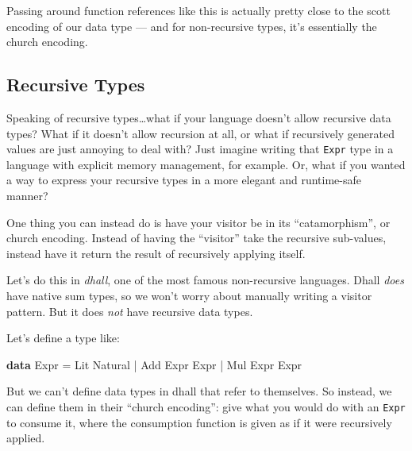 \documentclass[]{article}
\newenvironment{Shaded}{}{}
\newcommand{\DataTypeTok}[1]{\textcolor[rgb]{0.56,0.13,0.00}{#1}}
\newcommand{\KeywordTok}[1]{\textcolor[rgb]{0.00,0.44,0.13}{\textbf{#1}}}
\newcommand{\OperatorTok}[1]{\textcolor[rgb]{0.40,0.40,0.40}{#1}}
\newcommand{\OtherTok}[1]{\textcolor[rgb]{0.00,0.44,0.13}{#1}}
\begin{document}
Passing around function references like this is actually pretty close to the
scott encoding of our data type --- and for non-recursive types, it's
essentially the church encoding.

\subsection{Recursive Types}\label{recursive-types}

Speaking of recursive types\ldots what if your language doesn't allow recursive
data types? What if it doesn't allow recursion at all, or what if recursively
generated values are just annoying to deal with? Just imagine writing that
\texttt{Expr} type in a language with explicit memory management, for example.
Or, what if you wanted a way to express your recursive types in a more elegant
and runtime-safe manner?

One thing you can instead do is have your visitor be in its ``catamorphism'', or
church encoding. Instead of having the ``visitor'' take the recursive
sub-values, instead have it return the result of recursively applying itself.

Let's do this in \emph{dhall}, one of the most famous non-recursive languages.
Dhall \emph{does} have native sum types, so we won't worry about manually
writing a visitor pattern. But it does \emph{not} have recursive data types.

Let's define a type like:

\begin{Shaded}
\begin{Highlighting}[]
\KeywordTok{data} \DataTypeTok{Expr} \OtherTok{=} \DataTypeTok{Lit} \DataTypeTok{Natural}
          \OperatorTok{|} \DataTypeTok{Add} \DataTypeTok{Expr} \DataTypeTok{Expr}
          \OperatorTok{|} \DataTypeTok{Mul} \DataTypeTok{Expr} \DataTypeTok{Expr}
\end{Highlighting}
\end{Shaded}

But we can't define data types in dhall that refer to themselves. So instead, we
can define them in their ``church encoding'': give what you would do with an
\texttt{Expr} to consume it, where the consumption function is given as if it
were recursively applied.
\end{document}
